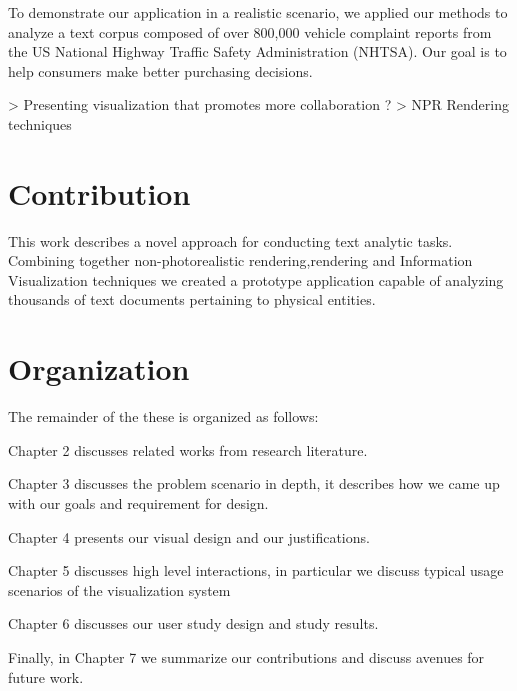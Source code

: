  
 To demonstrate our application in a realistic scenario, we applied our methods
 to analyze a text corpus composed of over 800,000 vehicle complaint reports
 from the US National Highway Traffic Safety Administration (NHTSA). Our goal is
 to help consumers make better purchasing decisions. 
 
 > Presenting visualization that promotes more collaboration ? > NPR Rendering techniques
 
 \section{Contribution}
 This work describes a novel approach for conducting text analytic tasks.
 Combining together non-photorealistic rendering,\threed rendering and
 Information Visualization techniques we created a prototype application capable
 of analyzing thousands of text documents pertaining to physical entities.
 

 
 \section{Organization}
 The remainder of the these is organized as follows:
 
 \noindent Chapter 2 discusses related works from research literature. 
 
 \noindent Chapter 3 discusses the problem scenario in depth, it describes how
 we came up with our goals and requirement for design.
 
 \noindent Chapter 4 presents our visual design and our justifications. 
 
 \noindent Chapter 5 discusses high level interactions, in particular we
 discuss typical usage scenarios of the visualization system
 
 \noindent Chapter 6 discusses our user study design and study results. 
 
 \noindent Finally, in Chapter 7 we summarize our contributions and discuss
 avenues for future work. 
  
 
  